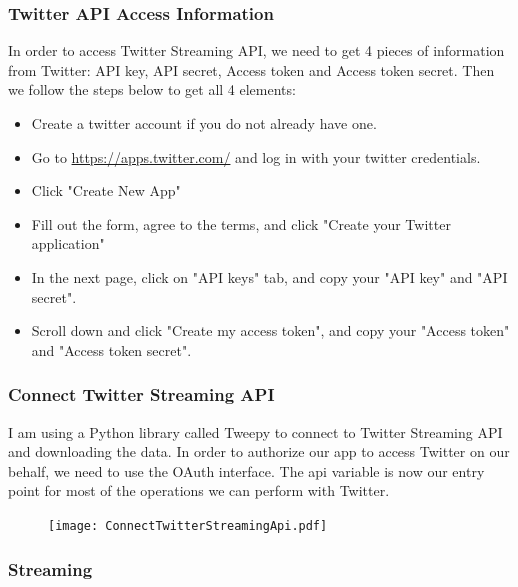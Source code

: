 \documentclass[12pt,notitlepage]{article}
\begin{document}
\subsubsection{Twitter API Access Information} 

In order to access Twitter Streaming API, we need to get 4 pieces of information from Twitter: API key, API secret, Access token and Access token secret. Then we follow the steps below to get all 4 elements:
\begin{itemize}
	\item Create a twitter account if you do not already have one.
	\item Go to \url{https://apps.twitter.com/} and log in with your twitter credentials.
	\item Click "Create New App"
	\item Fill out the form, agree to the terms, and click "Create your Twitter application"
	\item In the next page, click on "API keys" tab, and copy your "API key" and "API secret".
	\item Scroll down and click "Create my access token", and copy your "Access token" and "Access token secret".
\end{itemize}



\subsubsection{Connect Twitter Streaming API} 




I am using a Python library called Tweepy to connect to Twitter Streaming API and
downloading the data. In order to authorize our app to access Twitter on our behalf, we need to use the OAuth interface. The api variable is now our entry point for most of the operations we can perform with Twitter.


\begin{figure}[htb]
	\centering
	\texttt{[image: ConnectTwitterStreamingApi.pdf]}
	\caption{}
	\label{fig:ConnectTwitterStreamingApi}
\end{figure}


\subsubsection{Streaming} 
\end{document}
